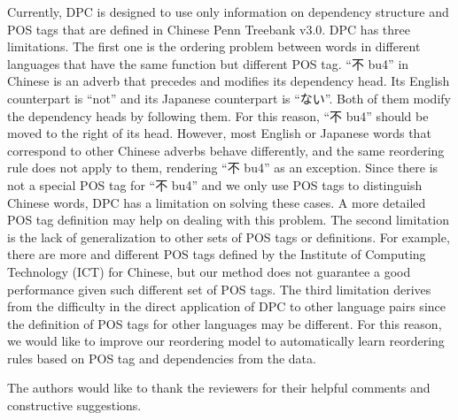 \documentclass[english]{jnlp_1.4}
\begin{document}
Currently, DPC is designed to use only information on dependency structure and
POS tags that are defined in Chinese Penn Treebank
v3.0. DPC has three limitations. The first one is the ordering problem between
words in different languages that have the same function but different POS tag.
``不 bu4'' in Chinese is an adverb that precedes and modifies its dependency head.
Its English counterpart is ``not'' and its Japanese counterpart is ``ない''.
Both of them modify the dependency heads by following them.
For this reason, ``不 bu4'' should be moved to the right of its head.
However, most English or Japanese words that correspond to other Chinese adverbs behave differently,
and the same reordering rule does not apply to them, rendering ``不 bu4'' as an exception.
Since there is not a special POS tag for ``不 bu4'' and we only use POS tags to distinguish Chinese words,
DPC has a limitation on solving these cases. A more detailed POS tag definition may help on dealing
with this problem. The second limitation is the lack of generalization to other sets of POS tags or definitions.
For example, there are more and different POS tags
defined by the Institute of Computing Technology (ICT) for Chinese,
but our method does not guarantee a good performance given such different set of POS tags.
The third limitation derives from the difficulty in the direct application of
DPC to other language pairs since the definition of POS tags for other languages
may be different. For this reason, we would like to improve our reordering model to
automatically learn reordering rules based on POS tag and dependencies from the data.

\acknowledgment

The authors would like to thank the reviewers for their helpful comments 
and constructive suggestions.
\end{document}
